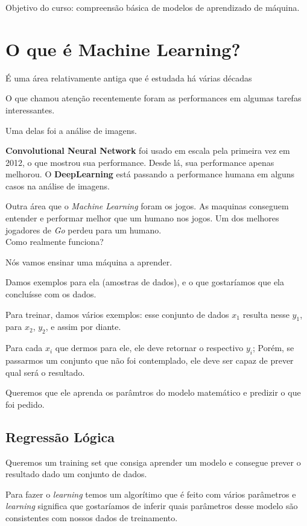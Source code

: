 \documentclass[11pt, a4paper]{article}
\begin{document}
Objetivo do curso: compreensão básica de modelos de aprendizado de máquina.

\section{O que é Machine Learning?}
É uma área relativamente antiga que é estudada há várias décadas

O que chamou atenção recentemente foram as performances em algumas tarefas interessantes.

Uma delas foi a análise de imagens.

\textbf{Convolutional Neural Network} foi usado em escala pela primeira vez em 2012, o que mostrou sua performance. Desde lá, sua performance apenas melhorou. O \textbf{DeepLearning} está passando a performance humana em alguns casos na análise de imagens.

Outra área que o \textit{Machine Learning} foram os jogos. As maquinas conseguem entender e performar melhor que um humano nos jogos. Um dos melhores jogadores de \textit{Go} perdeu para um humano.\\

Como realmente funciona?

Nós vamos ensinar uma máquina a aprender.

Damos exemplos para ela (amostras de dados), e o que gostaríamos que ela concluísse com os dados.

Para treinar, damos vários exemplos: esse conjunto de dados $x_1$ resulta nesse $y_1$, para $x_2$, $y_2$, e assim por diante.

Para cada $x_i$ que dermos para ele, ele deve retornar o respectivo $y_i$; Porém, se passarmos um conjunto que não foi contemplado, ele deve ser capaz de prever qual será o resultado.

Queremos que ele aprenda os parâmtros do modelo matemático e predizir o que foi pedido.

\subsection{Regressão Lógica}

Queremos um training set que consiga aprender um modelo e consegue prever o resultado dado um conjunto de dados.

Para fazer o \textit{learning} temos um algorítimo que é feito com vários parâmetros e \textit{learning} significa que gostaríamos de inferir quais parâmetros desse modelo são consistentes com nossos dados de treinamento.
\end{document}

